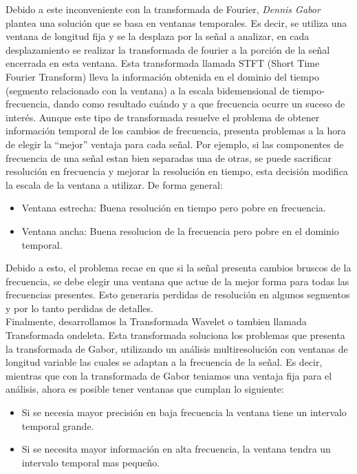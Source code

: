 \documentclass{article}
\begin{document}
Debido a este inconveniente con la transformada de Fourier, \textit{Dennis Gabor} plantea una solución que se basa en ventanas temporales. Es decir, se utiliza una ventana de longitud fija y se la desplaza 
por la señal a analizar, en cada desplazamiento se realizar la transformada de fourier a la porción de la señal encerrada en esta ventana. Esta transformada llamada STFT (Short Time Fourier Transform) lleva la información obtenida en el 
dominio del tiempo (segmento relacionado con la ventana) a la escala bidemensional de tiempo-frecuencia, dando como resultado cuándo y a que frecuencia ocurre un suceso de interés. Aunque este tipo de transformada resuelve el problema de obtener 
información temporal de los cambios de frecuencia, presenta problemas a la hora de elegir la ``mejor'' ventaja para cada señal. Por ejemplo, si las componentes de frecuencia de una señal 
estan bien separadas una de otras, se puede sacrificar resolución en frecuencia y mejorar la resolución en tiempo, esta decisión modifica la escala de la ventana a utilizar. De forma general:
\begin{itemize}
    \item Ventana estrecha: Buena resolución en tiempo pero pobre en frecuencia.
    \item Ventana ancha: Buena resolucion de la frecuencia pero pobre en el dominio temporal.
\end{itemize}
Debido a esto, el problema recae en que si la señal presenta cambios bruscos de la frecuencia, se debe elegir una ventana que actue de la mejor forma 
para todas las frecuencias presentes. Esto generaria perdidas de resolución en algunos segmentos y por lo tanto perdidas de detalles.\\
Finalmente, desarrollamos la Transformada Wavelet o tambien llamada Transformada ondeleta. Esta transformada soluciona los problemas que presenta la 
transformada de Gabor, utilizando un análisis multiresolución con ventanas de longitud variable las cuales se adaptan a la frecuencia de la señal. Es decir, mientras que con la transformada de 
Gabor teniamos una ventaja fija para el análisis, ahora es posible tener ventanas que cumplan lo siguiente:
\begin{itemize}
    \item Si se necesia mayor precisión en baja frecuencia la ventana tiene un intervalo temporal grande.
    \item Si se necesita mayor información en alta frecuencia, la ventana tendra un intervalo temporal mas pequeño.
\end{itemize}
\end{document}
